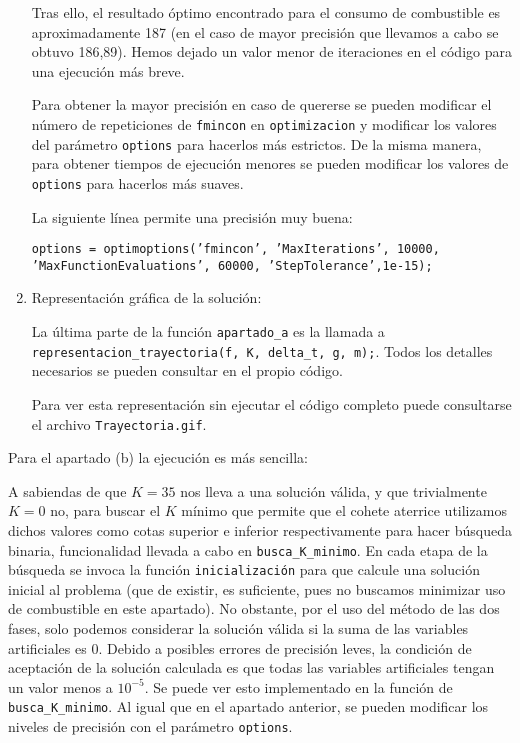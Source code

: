 \documentclass[10pt,a4paper]{article}
\begin{document}
\begin{enumerate}
Tras ello, el resultado óptimo encontrado para el consumo de combustible es aproximadamente 187 (en el caso de mayor precisión que llevamos a cabo se obtuvo 186,89). Hemos dejado un valor menor de iteraciones en el código para una ejecución más breve.

Para obtener la mayor precisión en caso de quererse se pueden modificar el número de repeticiones de \texttt{fmincon} en \texttt{optimizacion} y modificar los valores del parámetro \texttt{options} para hacerlos más estrictos. De la misma manera, para obtener tiempos de ejecución menores se pueden modificar los valores de \texttt{options} para hacerlos más suaves.

La siguiente línea permite una precisión muy buena:

\texttt{options = optimoptions('fmincon', 'MaxIterations', 10000, 'MaxFunctionEvaluations', 60000,         'StepTolerance',1e-15);}

\item Representación gráfica de la solución:

La última parte de la función \texttt{apartado\_a} es la llamada a \texttt{representacion\_trayectoria(f, K, delta\_t, g, m);}. Todos los detalles necesarios se pueden consultar en el propio código.

Para ver esta representación sin ejecutar el código completo puede consultarse el archivo \texttt{Trayectoria.gif}.

\end{enumerate}

Para el apartado (b) la ejecución es más sencilla:

A sabiendas de que $K = 35$ nos lleva a una solución válida, y que trivialmente $K = 0$ no, para buscar el $K$ mínimo que permite que el cohete aterrice utilizamos dichos valores como cotas superior e inferior respectivamente para hacer búsqueda binaria, funcionalidad llevada a cabo en \texttt{busca\_K\_minimo}. En cada etapa de la búsqueda se invoca la función \texttt{inicialización} para que calcule una solución inicial al problema (que de existir, es suficiente, pues no buscamos minimizar uso de combustible en este apartado). No obstante, por el uso del método de las dos fases, solo podemos considerar la solución válida si la suma de las variables artificiales es 0. Debido a posibles errores de precisión leves, la condición de aceptación de la solución calculada es que todas las variables artificiales tengan un valor menos a $10^{-5}$. Se puede ver esto implementado en la función de \texttt{busca\_K\_minimo}. Al igual que en el apartado anterior, se pueden modificar los niveles de precisión con el parámetro \texttt{options}.
\end{document}
